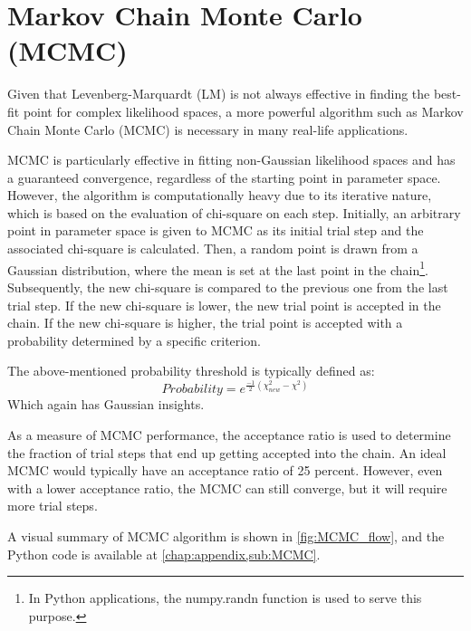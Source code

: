 \documentclass[12pt, TexShade, letterpaper]{report}
\begin{document}
\section{Markov Chain Monte Carlo (MCMC)}
Given that Levenberg-Marquardt (LM) is not always effective in finding the best-fit point for complex likelihood spaces, a more powerful algorithm such as Markov Chain Monte Carlo (MCMC) is necessary in many real-life applications. \par
MCMC is particularly effective in fitting non-Gaussian likelihood spaces and has a guaranteed convergence, regardless of the starting point in parameter space. However, the algorithm is computationally heavy due to its iterative nature, which is based on the evaluation of chi-square on each step. Initially, an arbitrary point in parameter space is given to MCMC as its initial trial step and the associated chi-square is calculated. Then, a random point is drawn from a Gaussian distribution, where the mean is set at the last point in the chain\footnote{In Python applications, the numpy.randn function is used to serve this purpose.}. Subsequently, the new chi-square is compared to the previous one from the last trial step. If the new chi-square is lower, the new trial point is accepted in the chain. If the new chi-square is higher, the trial point is accepted with a probability determined by a specific criterion.\par
The above-mentioned probability threshold is typically defined as:
\begin{equation}
    Probability = e^{\frac{-1}{2}\left(\chi_{new}^2 - \chi^2\right)} 
    \label{eq:mcmc_probability}
\end{equation}
Which again has Gaussian insights.\par
As a measure of MCMC performance, the acceptance ratio is used to determine the fraction of trial steps that end up getting accepted into the chain. An ideal MCMC would typically have an acceptance ratio of 25 percent. However, even with a lower acceptance ratio, the MCMC can still converge, but it will require more trial steps.\par
A visual summary of MCMC algorithm is shown in \ref{fig:MCMC_flow}, and the Python code is available at \ref{chap:appendix,sub:MCMC}.
\end{document}
